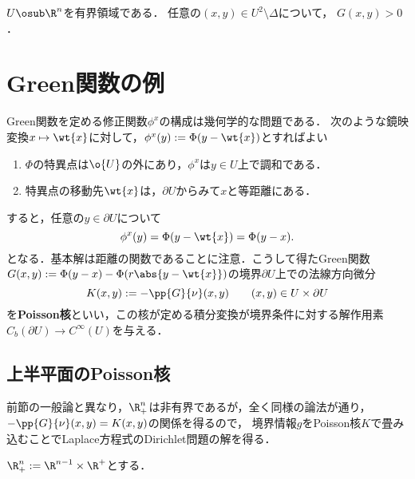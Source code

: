 \documentclass[uplatex,dvipdfmx]{jsreport}
\begin{document}
\begin{proposition}[Green関数は正値である]
    $U\osub\R^n$を有界領域である．
    任意の$(x,y)\in U^2\setminus\Delta$について，
    $G(x,y)>0$．
\end{proposition}

\section{Green関数の例}

\begin{tcolorbox}[colframe=ForestGreen, colback=ForestGreen!10!white,breakable,colbacktitle=ForestGreen!40!white,coltitle=black,fonttitle=\bfseries\sffamily,
title=]
    Green関数を定める修正関数$\phi^x$の構成は幾何学的な問題である．
    次のような鏡映変換$x\mapsto\wt{x}$に対して，$\phi^x(y):=\Phi(y-\wt{x})$とすればよい
    \begin{enumerate}
        \item $\Phi$の特異点は$\o{U}$の外にあり，$\phi^x$は$y\in U$上で調和である．
        \item 特異点の移動先$\wt{x}$は，$\partial U$からみて$x$と等距離にある．
    \end{enumerate}
    すると，任意の$y\in\partial U$について
    \[\phi^x(y)=\Phi(y-\wt{x})=\Phi(y-x).\]
    となる．基本解は距離の関数であることに注意．こうして得たGreen関数$G(x,y):=\Phi(y-x)-\Phi(r\abs{y-\wt{x}})$の境界$\partial U$上での法線方向微分
    \[K(x,y):=-\pp{G}{\nu}(x,y)\qquad(x,y)\in U\times\partial U\]
    を\textbf{Poisson核}といい，この核が定める積分変換が境界条件に対する解作用素$C_b(\partial U)\to C^\infty(U)$を与える．
\end{tcolorbox}

\subsection{上半平面のPoisson核}

\begin{tcolorbox}[colframe=ForestGreen, colback=ForestGreen!10!white,breakable,colbacktitle=ForestGreen!40!white,coltitle=black,fonttitle=\bfseries\sffamily,
title=]
    前節の一般論と異なり，$\R_+^n$は非有界であるが，全く同様の論法が通り，
    $-\pp{G}{\nu}(x,y)=K(x,y)$の関係を得るので，
    境界情報$g$をPoisson核$K$で畳み込むことでLaplace方程式のDirichlet問題の解を得る．
\end{tcolorbox}

\begin{notation}
    $\R^n_+:=\R^{n-1}\times\R^+$とする．
\end{notation}
\end{document}
